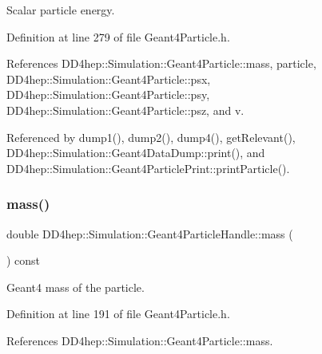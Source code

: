 Scalar particle energy. 



Definition at line 279 of file Geant4\+Particle.\+h.



References D\+D4hep\+::\+Simulation\+::\+Geant4\+Particle\+::mass, particle, D\+D4hep\+::\+Simulation\+::\+Geant4\+Particle\+::psx, D\+D4hep\+::\+Simulation\+::\+Geant4\+Particle\+::psy, D\+D4hep\+::\+Simulation\+::\+Geant4\+Particle\+::psz, and v.



Referenced by dump1(), dump2(), dump4(), get\+Relevant(), D\+D4hep\+::\+Simulation\+::\+Geant4\+Data\+Dump\+::print(), and D\+D4hep\+::\+Simulation\+::\+Geant4\+Particle\+Print\+::print\+Particle().

\hypertarget{class_d_d4hep_1_1_simulation_1_1_geant4_particle_handle_a50d50871551d37f282ffbf7058de25f3}{}\label{class_d_d4hep_1_1_simulation_1_1_geant4_particle_handle_a50d50871551d37f282ffbf7058de25f3} 
\subsubsection{\texorpdfstring{mass()}{mass()}}
{\footnotesize\ttfamily double D\+D4hep\+::\+Simulation\+::\+Geant4\+Particle\+Handle\+::mass (\begin{DoxyParamCaption}{ }\end{DoxyParamCaption}) const\hspace{0.3cm}{\ttfamily [inline]}}



Geant4 mass of the particle. 



Definition at line 191 of file Geant4\+Particle.\+h.



References D\+D4hep\+::\+Simulation\+::\+Geant4\+Particle\+::mass.

\hypertarget{class_d_d4hep_1_1_simulation_1_1_geant4_particle_handle_ae18006ef026dee07b7f7f32f275a9820}{}\label{class_d_d4hep_1_1_simulation_1_1_geant4_particle_handle_ae18006ef026dee07b7f7f32f275a9820} 
